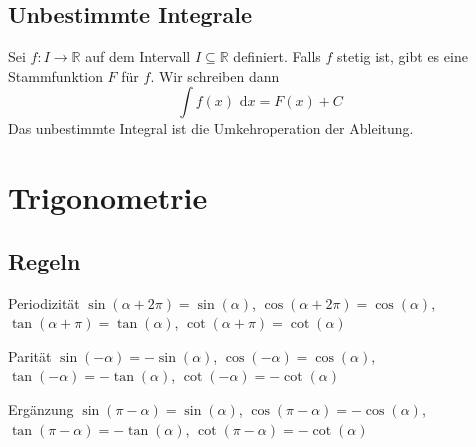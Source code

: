 \documentclass[a4paper,10pt]{article}
\def\R{\mathbb{R}}
\def\dx{\text{ d}x}
\begin{document}

\subsection{Unbestimmte Integrale}
Sei $f: I \to \R$ auf dem Intervall $I \subseteq \R$ definiert. Falls $f$ stetig ist, gibt es eine Stammfunktion $F$ für $f$. Wir schreiben dann
$$\int f(x) \dx = F(x) + C$$
Das unbestimmte Integral ist die Umkehroperation der Ableitung.

\section{Trigonometrie}

\subsection{Regeln}
\begin{subbox}{Periodizität}
$\sin(\alpha + 2 \pi) = \sin(\alpha)$, $\cos(\alpha + 2 \pi) = \cos(\alpha)$, $\tan(\alpha + \pi) = \tan(\alpha)$, $\cot(\alpha + \pi) = \cot(\alpha)$
\end{subbox}

\begin{subbox}{Parität}
$\sin(-\alpha) = - \sin(\alpha)$, $\cos(-\alpha) = \cos(\alpha)$, $\tan(-\alpha) = - \tan(\alpha)$, $\cot(-\alpha) = - \cot(\alpha)$
\end{subbox}

\begin{subbox}{Ergänzung}
$\sin(\pi - \alpha) = \sin(\alpha)$, $\cos(\pi - \alpha) = - \cos(\alpha)$, $\tan(\pi - \alpha) = -\tan(\alpha)$, $\cot(\pi - \alpha) = - \cot(\alpha)$
\end{subbox}
\end{document}
